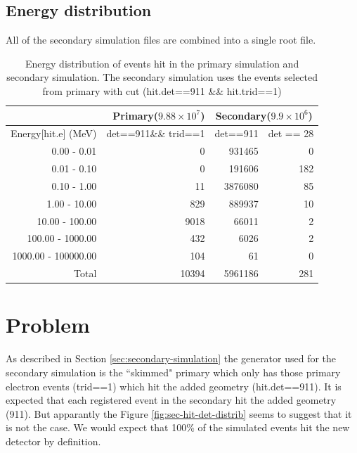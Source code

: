 \documentclass[a4paper,12pt]{article}
\begin{document}
\subsection{Energy distribution}
All of the secondary simulation files are combined into a single root file.
\begin{table}[h!] \label{tab:energy-distrib}
    \centering
    \caption{Energy distribution of events hit in the primary simulation and secondary simulation. The secondary simulation uses the events selected from primary with cut (hit.det==911 \&\& hit.trid==1)}
    \begin{tabular}{r|r|rr}
            &  Primary($9.88 \times 10^{7}$)  &  \multicolumn{2}{c}{Secondary($9.9 \times 10^{6}$)} \\
            \hline
        Energy[hit.e] (MeV) & det==911\&\& trid==1  &  det==911 &  det == 28 \\
        \hline \hline
        0.00 - 0.01         &    0 &   931465&     0 \\ %
        0.01 - 0.10         &    0 &  191606 &   182 \\
        0.10 - 1.00         &   11 & 3876080 &    85 \\
        1.00 - 10.00        &  829 &  889937 &    10 \\
        10.00 - 100.00      & 9018 &   66011 &     2 \\
        100.00 - 1000.00    &  432 &    6026 &     2 \\
        1000.00 - 100000.00 &  104 &      61 &     0 \\
        \hline
        Total               & 10394 &5961186 &   281\\
        \hline \hline
    \end{tabular}
\end{table}

\section{Problem}
    As described in  Section \ref{sec:secondary-simulation} the generator used for the secondary simulation is the ``skimmed" primary which only has those primary electron events (trid==1) which hit the added geometry (hit.det==911). It is expected that each registered event in the secondary hit the added geometry (911). But apparantly the Figure \ref{fig:sec-hit-det-distrib} seems to suggest that it is not the case. We would expect that 100\% of the simulated events hit the new detector by definition.
\end{document}
